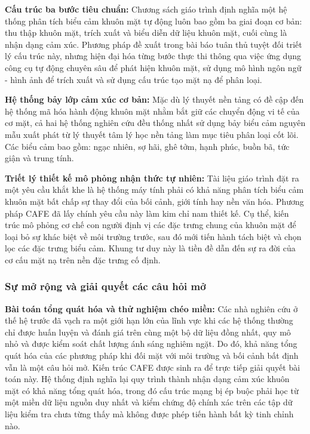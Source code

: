 \textbf{Cấu trúc ba bước tiêu chuẩn:}
Chương sách giáo trình định nghĩa một hệ thống phân tích biểu cảm khuôn mặt tự động luôn bao gồm ba giai đoạn cơ bản: thu thập khuôn mặt, trích xuất và biểu diễn dữ liệu khuôn mặt, cuối cùng là nhận dạng cảm xúc. Phương pháp đề xuất trong bài báo tuân thủ tuyệt đối triết lý cấu trúc này, nhưng hiện đại hóa từng bước thực thi thông qua việc ứng dụng công cụ tự động chuyên sâu để phát hiện khuôn mặt, sử dụng mô hình ngôn ngữ - hình ảnh để trích xuất và sử dụng cấu trúc tạo mặt nạ để phân loại.

\textbf{Hệ thống bảy lớp cảm xúc cơ bản:}
Mặc dù lý thuyết nền tảng có đề cập đến hệ thống mã hóa hành động khuôn mặt nhằm bắt giữ các chuyển động vi tế của cơ mặt, cả hai hệ thống nghiên cứu đều thống nhất sử dụng bảy biểu cảm nguyên mẫu xuất phát từ lý thuyết tâm lý học nền tảng làm mục tiêu phân loại cốt lõi. Các biểu cảm bao gồm: ngạc nhiên, sợ hãi, ghê tởm, hạnh phúc, buồn bã, tức giận và trung tính.

\textbf{Triết lý thiết kế mô phỏng nhận thức tự nhiên:}
Tài liệu giáo trình đặt ra một yêu cầu khắt khe là hệ thống máy tính phải có khả năng phân tích biểu cảm khuôn mặt bất chấp sự thay đổi của bối cảnh, giới tính hay nền văn hóa. Phương pháp CAFE đã lấy chính yêu cầu này làm kim chỉ nam thiết kế. Cụ thể, kiến trúc mô phỏng cơ chế con người định vị các đặc trưng chung của khuôn mặt để loại bỏ sự khác biệt về môi trường trước, sau đó mới tiến hành tách biệt và chọn lọc các đặc trưng biểu cảm. Khung tư duy này là tiền đề dẫn đến sự ra đời của cơ cấu mặt nạ trên nền đặc trưng cố định.

\subsubsection{Sự mở rộng và giải quyết các câu hỏi mở}

\textbf{Bài toán tổng quát hóa và thử nghiệm chéo miền:}
Các nhà nghiên cứu ở thế hệ trước đã vạch ra một giới hạn lớn của lĩnh vực khi các hệ thống thường chỉ được huấn luyện và đánh giá trên cùng một bộ dữ liệu đồng nhất, quy mô nhỏ và được kiểm soát chất lượng ánh sáng nghiêm ngặt. Do đó, khả năng tổng quát hóa của các phương pháp khi đối mặt với môi trường và bối cảnh bất định vẫn là một câu hỏi mở. Kiến trúc CAFE được sinh ra để trực tiếp giải quyết bài toán này. Hệ thống định nghĩa lại quy trình thành nhận dạng cảm xúc khuôn mặt có khả năng tổng quát hóa, trong đó cấu trúc mạng bị ép buộc phải học từ một miền dữ liệu nguồn duy nhất và kiểm chứng độ chính xác trên các tập dữ liệu kiểm tra chưa từng thấy mà không được phép tiến hành bất kỳ tinh chỉnh nào.

